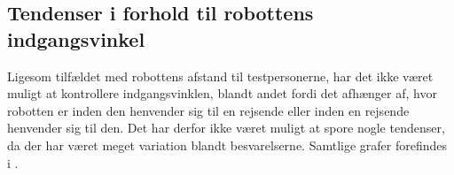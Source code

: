 \subsection{Tendenser i forhold til robottens indgangsvinkel}
\label{DatabehandlingIndgangsvinkelTendenser}
%
Ligesom tilfældet med robottens afstand til testpersonerne, har det ikke været muligt at kontrollere indgangsvinklen, blandt andet fordi det afhænger af, hvor robotten er inden den henvender sig til en rejsende eller inden en rejsende henvender sig til den. Det har derfor ikke været muligt at spore nogle tendenser, da der har været meget variation blandt besvarelserne. Samtlige grafer forefindes i . 

